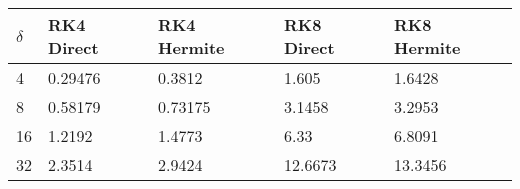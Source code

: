 \begin{tabular}{lllll}
$\delta$ & RK4 Direct & RK4 Hermite & RK8 Direct & RK8 Hermite\\ 
\hline 
4 & 0.29476 & 0.3812 & 1.605 & 1.6428 \\ 
8 & 0.58179 & 0.73175 & 3.1458 & 3.2953 \\ 
16 & 1.2192 & 1.4773 & 6.33 & 6.8091 \\ 
32 & 2.3514 & 2.9424 & 12.6673 & 13.3456 \\ 
\hline 
\end{tabular}